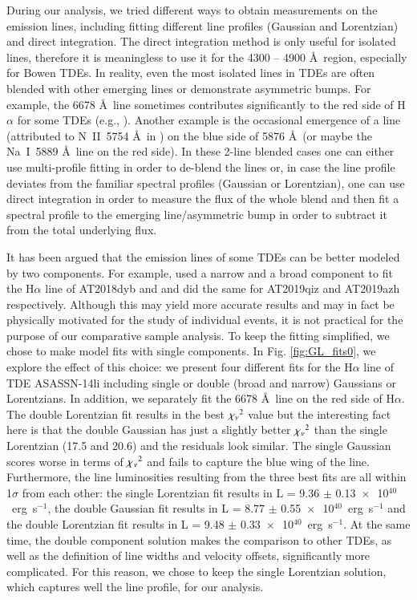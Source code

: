 \documentclass[structabstract]{aa}
\begin{document}
During our analysis, we tried different ways to obtain measurements on the emission lines, including fitting different line profiles (Gaussian and Lorentzian) and direct integration. The direct integration method is only useful for isolated lines, therefore it is meaningless to use it for the 4300 -- 4900 \AA\, region, especially for  Bowen TDEs. In reality, even the most isolated lines in TDEs are often blended with other emerging lines or demonstrate asymmetric bumps. For example, the  6678 \AA\, line sometimes contributes significantly to the red side of H$\alpha$ for some TDEs (e.g., \citealt{Blagorodnova2017,Leloudas2019,Nicholl2019}). 
Another example is the occasional emergence of a line (attributed to N~II~5754 \AA\, in \citealt{Blagorodnova2017}) on the blue side of  5876 \AA\, (or maybe the Na~I~5889 \AA\, line on the red side). In these 2-line blended cases one can either use multi-profile fitting in order to de-blend the lines or, in case the line profile deviates from the familiar spectral profiles (Gaussian or Lorentzian), one can use direct integration in order to measure the flux of the whole blend and then fit a spectral profile to the emerging line/asymmetric bump in order to subtract it from the total underlying flux. 

It has been argued that the emission lines of some TDEs can be better modeled by two components. For example, \citet{Holoien2020} used a narrow and a broad component to fit the H$\alpha$ line of AT2018dyb and \citet{Nicholl2020} and \citet{Hinkle2021} did the same for AT2019qiz and AT2019azh respectively. 
Although this may yield more accurate results and may in fact be physically motivated for the study of individual events, it is not practical for the purpose of our comparative sample analysis. To keep the fitting simplified, we chose to make model fits with single components.
In Fig. \ref{fig:GL_fits0}, we explore the effect of this choice: 
we present four different fits for the H$\alpha$ line of TDE ASASSN-14li including single or double (broad and narrow) Gaussians or Lorentzians. In addition, we separately fit the  6678 \AA\, line on the red side of H$\alpha$. 
The double Lorentzian fit results in the best ${\rm \chi_{\rm \nu}}^{2}$ value but the interesting fact here is that the double Gaussian has just a slightly better ${\rm \chi_{\rm \nu}}^{2}$ than the single Lorentzian (17.5 and 20.6) and the residuals look similar. The single Gaussian scores worse in terms of ${\rm \chi_{\rm \nu}}^{2}$ and fails to capture the blue wing of the line.
Furthermore, the line luminosities resulting from the three best fits are all within 1$\sigma$ from each other: the single Lorentzian fit results in L = 9.36 $\pm$ 0.13$\,\,\times\,$ 10$^{40}$~erg~s$^{-1}$, the double Gaussian fit results in L = 8.77 $\pm$ 0.55$\,\,\times\,$ 10$^{40}$~erg~s$^{-1}$ and the double Lorentzian fit results in L = 9.48 $\pm$ 0.33$\,\,\times\,$ 10$^{40}$~erg~s$^{-1}$. 
At the same time, the double component solution makes the comparison to other TDEs, as well as the definition of line widths and velocity offsets, significantly more complicated. 
For this reason, we chose to keep the single Lorentzian solution, which captures well the line profile, for our analysis. 
\end{document}
